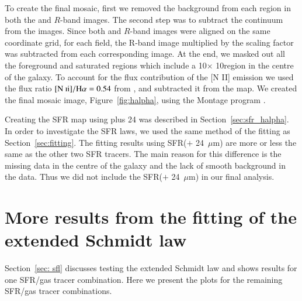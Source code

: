 {To create the final mosaic, first we removed the background from each region in both the \halpha and $R$-band images. The second step was to subtract the continuum from the \halpha images. Since both \halpha and $R$-band images were aligned on the same coordinate grid, for each field, the R-band image multiplied by the scaling factor was subtracted from each corresponding \halpha image. At the end, we masked out all the foreground and saturated regions which include a 10\arcmin $\times$ 10\arcmin region in the centre of the galaxy. To account for the flux contribution of the [N II] emission we used the flux ratio ${\mathrm {[N~{\textsc ii}]}}/{\mathrm H}\alpha = 0.54$ from \citet{Kennicutt08}, and subtracted it from the \halpha map. We created the final mosaic image, Figure~\ref{fig:halpha}, using the Montage program \citep{Berriman08}.

Creating the SFR map using \halpha plus 24 \um was described in Section~\ref{sec:sfr_halpha}. In order to investigate the SFR laws, we used the same method of the fitting as Section~\ref{sec:fitting}. The fitting results using SFR(\halpha $+$ 24~$\mu$m) are more or less the same as the other two SFR tracers. The main reason for this difference is the missing data in the centre of the galaxy and the lack of smooth background in the \halpha data. Thus we did not include the SFR(\halpha $+$ 24~$\mu$m) in our final analysis.

\newpage
\section{More results from the fitting of the extended Schmidt law}
\label{app:es,figs}
Section~\ref{sec: sfl} discusses testing the extended Schmidt law and shows results for one SFR/gas tracer combination. Here we present the plots for the remaining SFR/gas tracer combinations.


}
